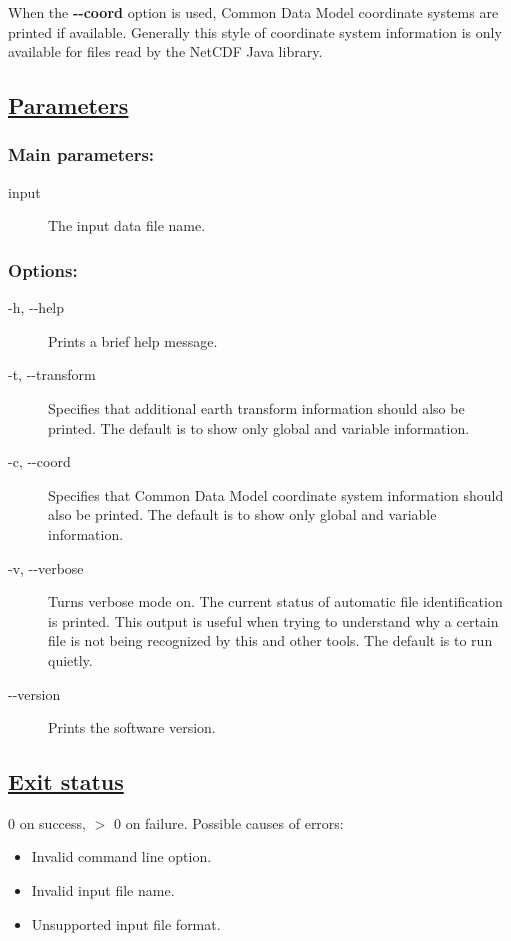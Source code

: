  When the \textbf{-{-}coord}
 option is used, Common Data Model coordinate systems are printed if available. Generally this style of coordinate system information is only available for files read by the NetCDF Java library.
\subsection*{\underline{Parameters}}
\subsubsection*{Main parameters:}
\begin{description}
\item[input]The input data file name.

\end{description}
\subsubsection*{Options:}
\begin{description}
\item[ -h, -{-}help ] Prints a brief help message. 
\item[ -t, -{-}transform ] Specifies that additional earth transform information should also be printed. The default is to show only global and variable information. 
\item[ -c, -{-}coord ] Specifies that Common Data Model coordinate system information should also be printed. The default is to show only global and variable information. 
\item[ -v, -{-}verbose ] Turns verbose mode on. The current status of automatic file identification is printed. This output is useful when trying to understand why a certain file is not being recognized by this and other tools. The default is to run quietly. 
\item[-{-}version]Prints the software version.

\end{description}
\subsection*{\underline{Exit status}}


  0 on success, $>$ 0 on failure. Possible causes of errors:
\begin{itemize}
\item  Invalid command line option. 
\item  Invalid input file name. 
\item  Unsupported input file format. 

\end{itemize}
